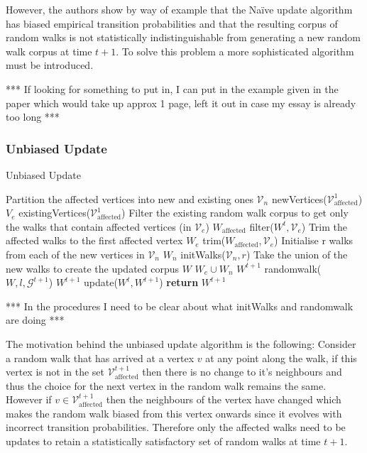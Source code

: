 \documentclass[a4paper]{article}
\renewcommand{\G}{\mathcal G}
\renewcommand{\V}{\mathcal V}
\begin{document}
However, the authors show by way of example that the Naïve update algorithm has
biased empirical transition probabilities and that the resulting corpus of
random walks is not statistically indistinguishable from generating a new random
walk corpus at time $t+1$. To solve this problem a more sophisticated algorithm
must be introduced.

*** If looking for something to put in, I can put in the example given in the
paper which would take up approx 1 page, left it out in case my essay is already
too long ***

\subsubsection{Unbiased Update}

\begin{algorithm}
  \caption{Unbiased Update}
  \begin{algorithmic}[1]

    \Procedure{UnbiasedUpdate}{$\G^{t+1}, W^t, \V^1_{\text{affected}}, r, l$}
    \LineComment Partition the affected vertices into new and existing ones
    \State $\V_n$ \leftarrow newVertices($\V_{\text{affected}}^1$)
    \State $V_e$ \leftarrow existingVertices($\V_{\text{affected}}^1$)
    \LineComment Filter the existing random walk corpus to get only the walks
    that contain affected vertices (in $\V_e$)
    \State $W_{\text{affected}}$ \leftarrow filter($W^t, \V_e$)
    \LineComment Trim the affected walks to the first affected vertex
    \State $W_e$ \leftarrow trim($W_{\text{affected}}, \V_e$)
    \LineComment \leftarrow Initialise r walks from each of the new vertices in $\V_n$
    \State $W_n$ \leftarrow initWalks($\V_n, r$)
    \LineComment Take the union of the new walks to create the updated corpus
    \State $W$ \leftarrow $W_e \cup W_n$
    \State $W^{t+1}$ \leftarrow randomwalk($W, l, \G^{t+1}$)
    \State $W^{t+1}$ \leftarrow update($W^t, W^{t+1}$)
    \State \textbf{return} $W^{t+1}$
    \EndProcedure
  \end{algorithmic}
\end{algorithm}

*** In the procedures I need to be clear about what initWalks and randomwalk are
doing ***

The motivation behind the unbiased update algorithm is the following: Consider a
random walk that has arrived at a vertex $v$ at any point along the walk, if
this vertex is not in the set $\V^{t+1}_{\text{affected}}$ then there is no
change to it's neighbours and thus the choice for the next vertex in the random
walk remains the same. However if $v \in \V^{t+1}_{\text{affected}}$ then the
neighbours of the vertex have changed which makes the random walk biased from
this vertex onwards since it evolves with incorrect transition probabilities. Therefore only the affected walks need to be updates to retain a statistically
satisfactory set of random walks at time $t+1$.\\
\end{document}
